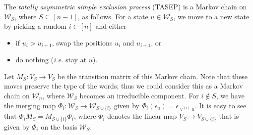 \documentclass[reqno]{amsart}
\newcommand{\0}{\phantom{c}}
\newcommand{\merge}[1]{\vee_{#1}} %
\newcommand{\mm}{\mathbf{m}}
\newcommand{\mcW}{\mathcal{W}}
\newcommand{\set}[1]{\left\{ #1 \right\}}
\newcommand{\defn}[1]{{\color{darkred}\emph{#1}}} %
\theoremstyle{plain}
\theoremstyle{definition}
\numberwithin{equation}{section}
\begin{document}
The \defn{totally asymmetric simple exclusion process} (TASEP) is a Markov chain on $\mcW_S$, where $S \subseteq[n-1]$, as follows.
For a state $u \in \mcW_S$, we move to a new state by picking a random $i \in [n]$ and either
\begin{itemize}
\item if $u_i > u_{i+1}$, swap the positions $u_i$ and $u_{i+1}$, or
\item do nothing (\textit{i.e.} stay at $u$).
\end{itemize}
Let $M_S \colon V_S \to V_S$ be the transition matrix of this Markov chain.
Note that these moves preserve the type of the words; thus we could consider this as a Markov chain on $\mcW_n$, where $\mcW_S$ becomes an irreducible component.
For $i \notin S$, we have the merging map $\Phi_i \colon \mcW_S \to \mcW_{S\cup\{i\}}$ given by
$\Phi_i(\epsilon_u) = \epsilon_{\vee^{(i)} u}$.
It is easy to see that $\Phi_i M_S = M_{S\cup \{i\}} \Phi_i$, where $\Phi_i$ denotes the linear map $V_S \to V_{S\cup\{i\}}$ that is given by $\Phi_i$ on the basis $\mcW_S$. 
\end{document}
